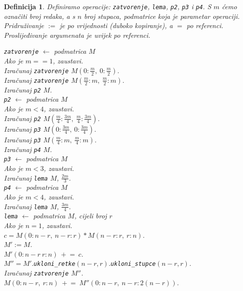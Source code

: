 \documentclass[a4paper,oneside,12pt]{article} %
\newtheorem{lmdef}{Definicija}
\begin{document}
    \begin{lmdef}
        Definiramo operacije: \verb|zatvorenje|, \verb|lema|, \verb|p2|, \verb|p3| i \verb|p4|.
        S $m$ ćemo označiti broj redaka, a s $n$ broj stupaca, podmatrice koja je parametar operaciji.
        Pridruživanje $:=$ je po vrijednosti (duboko kopiranje), a $=$ po referenci.
        Proslijeđivanje argumenata je uvijek po referenci.
        
        \verb|zatvorenje| $\leftarrow$ podmatrica $M$ \\
        Ako je $m == 1$, zaustavi.\\
        Izračunaj \verb|zatvorenje| $M(0:\frac{m}{2},\ 0:\frac{m}{2})$. \\
        Izračunaj \verb|zatvorenje| $M(\frac{m}{2}:m,\ \frac{m}{2}:m)$. \\
        Izračunaj \verb|p2| $M$. \\
        
        \verb|p2| $\leftarrow$ podmatrica $M$ \\
        Ako je $m < 4$, zaustavi.\\
        Izračunaj \verb|p2| $M(\frac{m}{4}:\frac{3m}{4},\ \frac{m}{4}:\frac{3m}{4})$. \\
        Izračunaj \verb|p3| $M(0:\frac{3m}{4},\ 0:\frac{3m}{4})$. \\
        Izračunaj \verb|p3| $M(\frac{m}{4}:m,\ \frac{m}{4}:m)$. \\
        Izračunaj \verb|p4| $M$. \\
        
        \verb|p3| $\leftarrow$ podmatrica $M$ \\
        Ako je $m < 3$, zaustavi.\\
        Izračunaj \verb|lema| $M$, $\frac{2m}{3}$. \\
        
        \verb|p4| $\leftarrow$ podmatrica $M$ \\
        Ako je $m < 4$, zaustavi.\\
        Izračunaj \verb|lema| $M$, $\frac{3m}{4}$. \\
        
        \verb|lema| $\leftarrow$ podmatrica $M$, cijeli broj $r$ \\
        Ako je $n = 1$, zaustavi. \\
        $c = M(0:n-r,\ n-r:r) * M(n-r:r,\ r:n)$. \\
        $M' := M$. \\
        $M'(0:n-r\ r:n)\ \mathrel{+}=\ c$. \\
        $M'' = M'.$\verb|ukloni_retke|$(n-r, r).$\verb|ukloni_stupce|$(n-r, r)$. \\
        Izračunaj \verb|zatvorenje| $M''$. \\
        $M(0:n-r,\ r:n)\ \mathrel{+}=\ M''(0:n-r,\ n-r:2(n-r))$.
        
    \end{lmdef}
    
\end{document}
